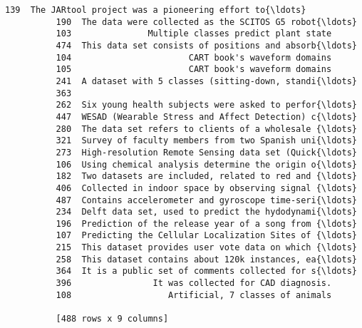 \documentclass[11pt]{article}
\begin{document}
\begin{Verbatim}[commandchars=\\\{\}]
          139  The JARtool project was a pioneering effort to{\ldots}  
          190  The data were collected as the SCITOS G5 robot{\ldots}  
          103               Multiple classes predict plant state  
          474  This data set consists of positions and absorb{\ldots}  
          104                       CART book's waveform domains  
          105                       CART book's waveform domains  
          241  A dataset with 5 classes (sitting-down, standi{\ldots}  
          363                                                     
          262  Six young health subjects were asked to perfor{\ldots}  
          447  WESAD (Wearable Stress and Affect Detection) c{\ldots}  
          280  The data set refers to clients of a wholesale {\ldots}  
          321  Survey of faculty members from two Spanish uni{\ldots}  
          273  High-resolution Remote Sensing data set (Quick{\ldots}  
          106  Using chemical analysis determine the origin o{\ldots}  
          182  Two datasets are included, related to red and {\ldots}  
          406  Collected in indoor space by observing signal {\ldots}  
          487  Contains accelerometer and gyroscope time-seri{\ldots}  
          234  Delft data set, used to predict the hydodynami{\ldots}  
          196  Prediction of the release year of a song from {\ldots}  
          107  Predicting the Cellular Localization Sites of {\ldots}  
          215  This dataset provides user vote data on which {\ldots}  
          258  This dataset contains about 120k instances, ea{\ldots}  
          364  It is a public set of comments collected for s{\ldots}  
          396                It was collected for CAD diagnosis.  
          108                   Artificial, 7 classes of animals  
          
          [488 rows x 9 columns]
\end{Verbatim}
            

    
    
    
    
\end{document}

